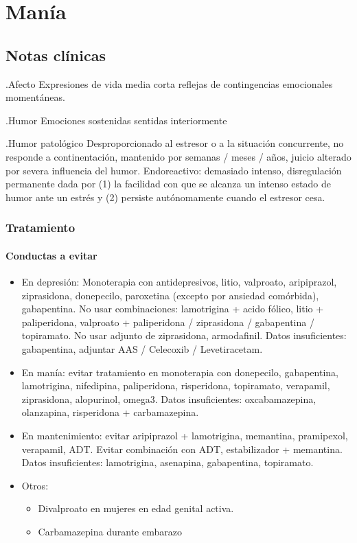 \chapter{Manía}
\section*{Notas clínicas}

.Afecto
Expresiones de vida media corta reflejas de contingencias emocionales momentáneas.

.Humor
Emociones sostenidas sentidas interiormente

.Humor patológico
Desproporcionado al estresor o a la situación concurrente, no responde a continentación, mantenido por semanas / meses / años, juicio alterado por severa influencia del humor. Endoreactivo: demasiado intenso, disregulación permanente dada por (1) la facilidad con que se alcanza un intenso estado de humor ante un estrés y (2) persiste autónomamente cuando el estresor cesa.

\subsection*{Tratamiento}
\subsubsection*{Conductas a evitar}
\begin{itemize}
	\item En depresión: Monoterapia con antidepresivos, litio, valproato, aripiprazol, ziprasidona, donepecilo, paroxetina (excepto por ansiedad comórbida), gabapentina. No usar combinaciones: lamotrigina + acido fólico, litio + paliperidona, valproato + paliperidona / ziprasidona / gabapentina / topiramato. No usar adjunto de ziprasidona, armodafinil. Datos insuficientes: gabapentina, adjuntar AAS / Celecoxib / Levetiracetam.
	\item En manía: evitar tratamiento en monoterapia con donepecilo, gabapentina, lamotrigina, nifedipina, paliperidona, risperidona, topiramato, verapamil, ziprasidona, alopurinol, omega3. Datos insuficientes: oxcabamazepina, olanzapina, risperidona + carbamazepina.
	\item En mantenimiento: evitar aripiprazol + lamotrigina, memantina, pramipexol, verapamil, ADT. Evitar combinación con ADT, estabilizador + memantina. Datos insuficientes: lamotrigina, asenapina, gabapentina, topiramato.
	\item Otros:
	\begin{itemize}
  		\item Divalproato en mujeres en edad genital activa.
		\item Carbamazepina durante embarazo
	\end{itemize}
\end{itemize}
